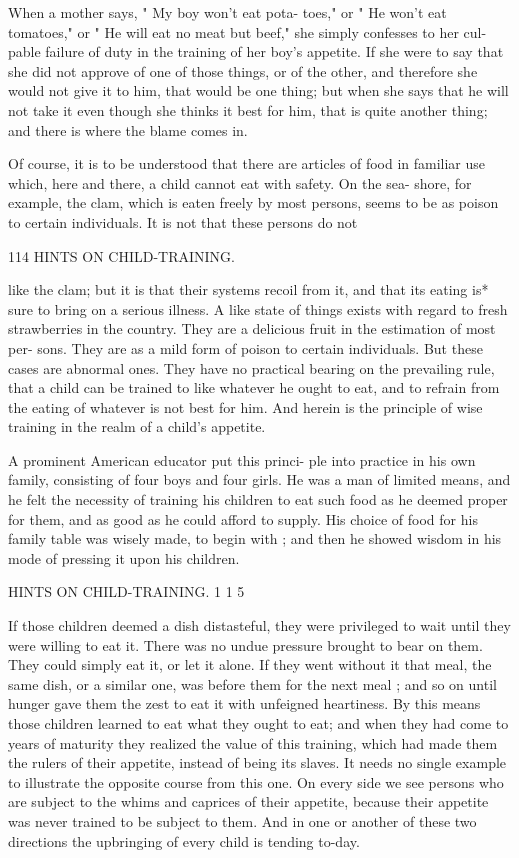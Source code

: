 \documentclass[
]{book}
\begin{document}
When a mother says, " My boy won't eat pota- toes," or " He won't eat tomatoes," or " He will eat no meat but beef," she simply confesses to her cul- pable failure of duty in the training of her boy's appetite. If she were to say that she did not approve of one of those things, or of the other, and therefore she would not give it to him, that would be one thing; but when she says that he will not take it even though she thinks it best for him, that is quite another thing; and there is where the blame comes in.

Of course, it is to be understood that there are articles of food in familiar use which, here and there, a child cannot eat with safety. On the sea- shore, for example, the clam, which is eaten freely by most persons, seems to be as poison to certain individuals. It is not that these persons do not

114 HINTS ON CHILD-TRAINING.

like the clam; but it is that their systems recoil from it, and that its eating is* sure to bring on a serious illness. A like state of things exists with regard to fresh strawberries in the country. They are a delicious fruit in the estimation of most per- sons. They are as a mild form of poison to certain individuals. But these cases are abnormal ones. They have no practical bearing on the prevailing rule, that a child can be trained to like whatever he ought to eat, and to refrain from the eating of whatever is not best for him. And herein is the principle of wise training in the realm of a child's appetite.

A prominent American educator put this princi- ple into practice in his own family, consisting of four boys and four girls. He was a man of limited means, and he felt the necessity of training his children to eat such food as he deemed proper for them, and as good as he could afford to supply. His choice of food for his family table was wisely made, to begin with ; and then he showed wisdom in his mode of pressing it upon his children.

HINTS ON CHILD-TRAINING. 1 1 5

If those children deemed a dish distasteful, they were privileged to wait until they were willing to eat it. There was no undue pressure brought to bear on them. They could simply eat it, or let it alone. If they went without it that meal, the same dish, or a similar one, was before them for the next meal ; and so on until hunger gave them the zest to eat it with unfeigned heartiness. By this means those children learned to eat what they ought to eat; and when they had come to years of maturity they realized the value of this training, which had made them the rulers of their appetite, instead of being its slaves. It needs no single example to illustrate the opposite course from this one. On every side we see persons who are subject to the whims and caprices of their appetite, because their appetite was never trained to be subject to them. And in one or another of these two directions the upbringing of every child is tending to-day.
\end{document}

